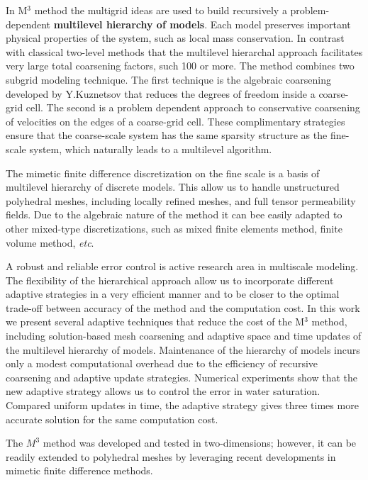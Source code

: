 \documentclass{report}
\begin{document}
In M$^3$ method the multigrid ideas are used to build recursively a problem-dependent
\textbf{multilevel hierarchy of models}. Each model preserves
important physical properties of the system, such as local mass
conservation. In contrast with classical two-level methods that
the multilevel hierarchal approach facilitates very large
total coarsening factors, such 100 or more.
The method combines two subgrid modeling technique.
The first technique is the
algebraic coarsening developed by Y.Kuznetsov that reduces the degrees
of freedom inside a coarse-grid cell. The
second is a problem dependent approach to conservative coarsening of
velocities on the edges of a coarse-grid cell. These complimentary
strategies ensure that the coarse-scale system has the same sparsity
structure as the fine-scale system, which naturally leads to a
multilevel algorithm.

The mimetic finite difference discretization on the fine scale is
a basis of multilevel hierarchy of discrete models. This allow us to handle
unstructured polyhedral meshes, including locally refined meshes, and
full tensor permeability fields.
Due to the algebraic nature of the method it can bee easily adapted to
other mixed-type discretizations,
such as mixed finite elements method, finite volume method, {\it etc}.


A robust and reliable error control is active research area in multiscale modeling.
The flexibility of the hierarchical approach allow us to incorporate different
adaptive strategies in a very efficient manner and to be closer to the
optimal trade-off between accuracy of the method and the computation cost.
In this work we present several adaptive techniques that reduce the cost
of the M$^3$ method,
including solution-based mesh coarsening and adaptive space and time
updates of the multilevel hierarchy of models.
Maintenance of the hierarchy of models incurs only a modest
computational overhead due to the efficiency of recursive
coarsening and adaptive update strategies.
Numerical experiments show that the new adaptive strategy allows us to
control the error in
water saturation. Compared uniform updates in time, the adaptive strategy gives
three times more accurate solution for the same computation cost.


The $M^3$ method was developed and tested in two-dimensions; however, it
can be readily extended
to polyhedral meshes by leveraging recent developments in mimetic finite difference
methods.
\end{document}
